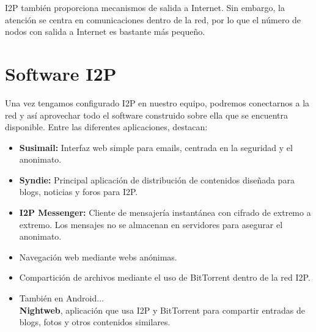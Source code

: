    I2P también proporciona mecanismos de salida a Internet. Sin embargo, la atención se centra en comunicaciones dentro de la red, por lo que el número de nodos con salida a Internet es bastante más pequeño.
   
\section{Software I2P}
Una vez tengamos configurado I2P en nuestro equipo, podremos conectarnos a la red y así aprovechar todo el software construido sobre ella que se encuentra disponible. Entre las diferentes aplicaciones, destacan:
 
 \begin{itemize}
 	\item \textbf{Susimail:} Interfaz web simple para emails, centrada en la seguridad y el anonimato.
 	\item \textbf{Syndie:} Principal aplicación de distribución de contenidos diseñada para blogs, noticias y foros para I2P.
 	\item \textbf{I2P Messenger:} Cliente de mensajería instantánea con cifrado de extremo a extremo. Los mensajes no se almacenan en servidores para asegurar el anonimato.
 	\item Navegación web mediante webs anónimas.
 	\item Compartición de archivos mediante el uso de BitTorrent dentro de la red I2P.
 	\item También en Android$\dots$\\
 	\textbf{Nightweb}, aplicación que usa I2P y BitTorrent para compartir entradas de blogs, fotos y otros contenidos similares.
 \end{itemize}
    
